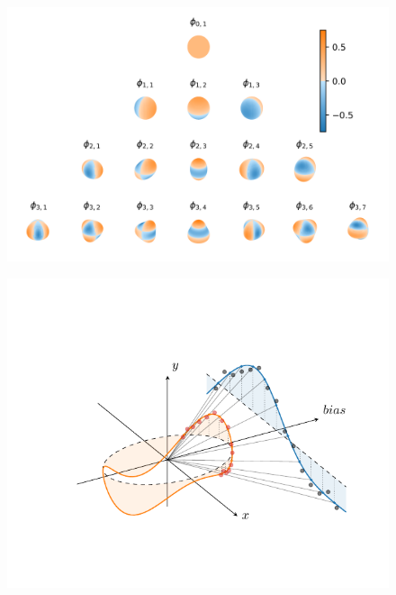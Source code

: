 \begin{figure}[t]
\centering
\begin{minipage}{.48\textwidth}
  \centering
  \includegraphics[width=\linewidth]{harmonics}
  \label{fig:harmonics}
\end{minipage}\hfill
\begin{minipage}{.48\textwidth}
  \centering
  \includegraphics[width=\linewidth,trim=1.5cm 1.6cm 1.cm 1.55cm,clip=true]{mapping}
  \label{fig:mapping}
\end{minipage}
\end{figure}

